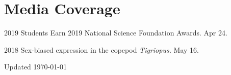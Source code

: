 \documentclass[12pt,letterpaper]{report}
\begin{document}
    \section*{Media Coverage}

    \begin{tablist}
    	
    	\item[2019]  Students Earn 2019 National Science Foundation Awards. Apr 24.
    	
    	\item[2018]	 Sex-biased expression in the copepod {{\emph{Tigriopus.}}} May 16.
        
    \end{tablist}

    \begin{center}
        \vfill
        Updated \monthyeardate\today
    \end{center}
\end{document}

